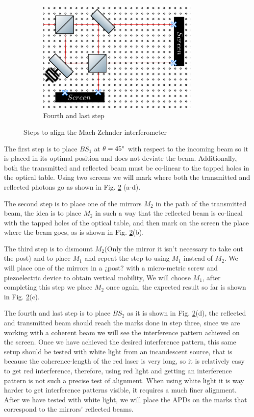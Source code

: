 \documentclass{book}
\begin{document}
\begin{figure}[]
\begin{subfigure}[b]{0.55\linewidth}
\includegraphics[width=8cm,height=4 cm]{images/last_step.png}
\caption{Fourth and last step}
\label{fig:westminster_aerea}
\end{subfigure}
\caption{Steps to align the Mach-Zehnder interferometer}
\label{steps}
\end{figure}



The first step is to place $BS_{1}$ at $\theta=45\degree$ with respect to the incoming beam so it is placed in its optimal position and does not deviate the beam. Additionally, both the transmitted and reflected beam must be co-linear to the tapped holes in the optical table. Using two screens we will mark where both the transmitted and reflected photons go as shown in Fig. \ref{steps} (a-d).

The second step is to place one of the mirrors $M_{2}$ in the path of the transmitted beam, the idea is to place $M_{2}$ in such a way that the reflected beam is co-lineal with the tapped holes of the optical table, and then mark on the screen the place where the beam goes, as is shown in Fig. \ref{steps}(b).

The third step is to dismount $M_{2}$(Only the mirror it isn't necessary to take out the post) and to place $M_{1}$ and repeat the step to using $M_{1}$ instead of $M_{2}$. We will place one of the mirrors in a ¿post? with a micro-metric screw and piezoelectric device to obtain vertical mobility, We will choose $M_{1}$, after completing this step we place $M_{2}$ once again, the expected result so far is shown in Fig. \ref{steps}(c).

The fourth and last step is to place $BS_{2}$ as it is shown in Fig. \ref{steps}(d), the reflected and transmitted beam should reach the marks done in step three, since we are working with a coherent beam we will see the interference pattern achieved on the screen. Once we have achieved the desired interference pattern, this same setup should be tested with white light from an incandescent source, that is because the coherence-length of the red laser is very long, so it is relatively easy to get red interference, therefore, using red light and getting an interference pattern is not such a precise test of alignment. When using white light it is way harder to get interference patterns visible, it requires a much finer alignment. After we have tested with white light, we will place the APDs on the marks that correspond to the mirrors' reflected beams.
\end{document}

